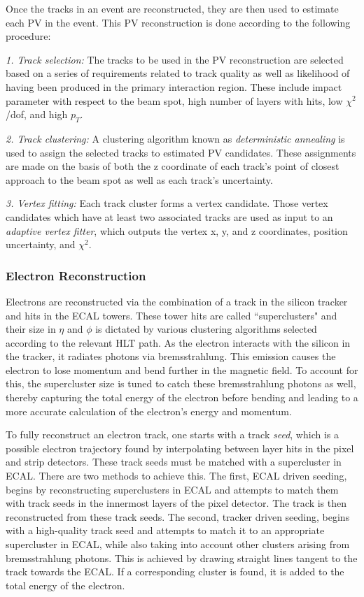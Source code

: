 Once the tracks in an event are reconstructed, they are then used to estimate each PV in the event. This PV reconstruction is done according to the following procedure\cite{TrackReco}:


\noindent\emph{1. Track selection:} The tracks to be used in the PV reconstruction are selected based on a series of requirements related to track quality as well as likelihood of having been produced in the primary interaction region. These include impact parameter with respect to the beam spot, high number of layers with hits, low $\chi^2$/dof, and high $p_T$.


\noindent\emph{2. Track clustering:} A clustering algorithm known as \textit{deterministic annealing} is used to assign the selected tracks to estimated PV candidates. These assignments are made on the basis of both the z coordinate of each track's point of closest approach to the beam spot as well as each track's uncertainty.


\noindent\emph{3. Vertex fitting:} Each track cluster forms a vertex candidate. Those vertex candidates which have at least two associated tracks are used as input to an \textit{adaptive vertex fitter}\cite{AdaptiveVertexFitter}, which outputs the vertex x, y, and z coordinates, position uncertainty, and $\chi^2$.


\subsubsection{Electron Reconstruction}

Electrons are reconstructed via the combination of a track in the silicon tracker and hits in the ECAL towers. These tower hits are called ``superclusters" and their size in $\eta$ and $\phi$ is dictated by various clustering algorithms selected according to the relevant HLT path. As the electron interacts with the silicon in the tracker, it radiates photons via bremsstrahlung. This emission causes the electron to lose momentum and bend further in the magnetic field. To account for this, the supercluster size is tuned to catch these bremsstrahlung photons as well, thereby capturing the total energy of the electron before bending and leading to a more accurate calculation of the electron's energy and momentum. 

To fully reconstruct an electron track, one starts with a track \emph{seed}, which is a possible electron trajectory found by interpolating between layer hits in the pixel and strip detectors. These track seeds must be matched with a supercluster in ECAL. There are two methods to achieve this. The first, ECAL driven seeding, begins by reconstructing superclusters in ECAL and attempts to match them with track seeds in the innermost layers of the pixel detector. The track is then reconstructed from these track seeds. The second, tracker driven seeding, begins with a high-quality track seed and attempts to match it to an appropriate supercluster in ECAL, while also taking into account other clusters arising from bremsstrahlung photons. This is achieved by drawing straight lines tangent to the track towards the ECAL. If a corresponding cluster is found, it is added to the total energy of the electron.

